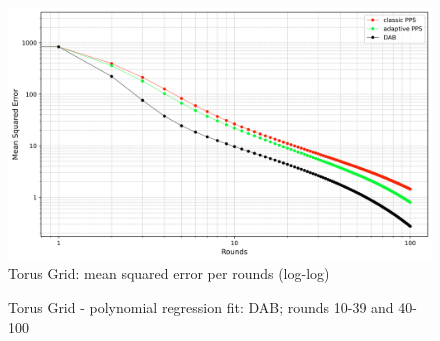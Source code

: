 \begin{figure}[]
    \centering
    \includegraphics[width=\linewidth]{figures/Simulation_outcomes/TorusGridGraph/DAB_vs_PPS_TGG_r100_n1024_averaged_loglog.png}
    \caption{Torus Grid: mean squared error per rounds (log-log)}
    \label{fig:torusMSEperRoundLogLog}
\end{figure}
\begin{figure}[!ht]
     \centering
     \hfil
     \caption{Torus Grid - polynomial regression fit: DAB; rounds 10-39 and 40-100}
         \label{fig:dabTorusModelFit}
 \end{figure}
